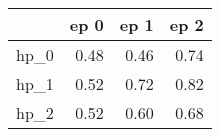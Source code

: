 \begin{tabular}{lrrr}
\toprule
{} &  ep 0 &  ep 1 &  ep 2 \\
\midrule
hp\_0 &  0.48 &  0.46 &  0.74 \\
hp\_1 &  0.52 &  0.72 &  0.82 \\
hp\_2 &  0.52 &  0.60 &  0.68 \\
\bottomrule
\end{tabular}
